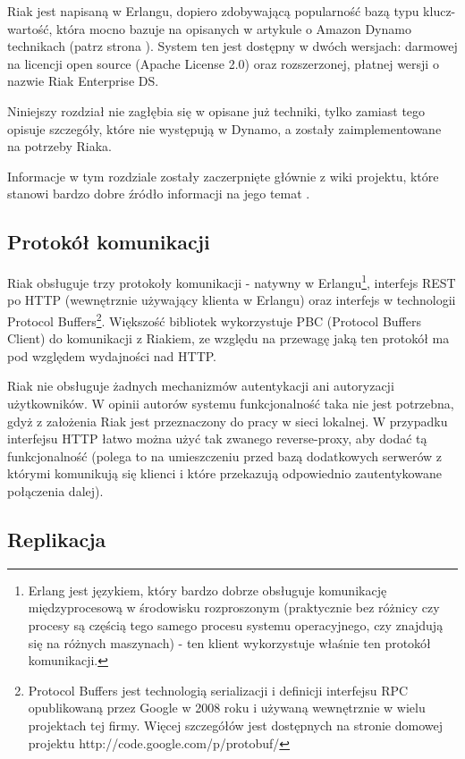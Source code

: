 Riak jest napisaną w Erlangu, dopiero zdobywającą popularność bazą typu klucz-wartość, która mocno bazuje na opisanych w artykule o Amazon Dynamo technikach (patrz strona \pageref{sec:dynamo-techniki}).
System ten jest dostępny w dwóch wersjach: darmowej na licencji open source (Apache License 2.0) oraz rozszerzonej, płatnej wersji o nazwie Riak Enterprise DS.

Niniejszy rozdział nie zagłębia się w opisane już techniki, tylko zamiast tego opisuje szczegóły, które nie występują w Dynamo, a zostały zaimplementowane na potrzeby Riaka.

Informacje w tym rozdziale zostały zaczerpnięte głównie z wiki projektu, które stanowi bardzo dobre źródło informacji na jego temat \cite{riak-wiki}.

\subsection*{Protokół komunikacji}

Riak obsługuje trzy protokoły komunikacji - natywny w Erlangu\footnote{Erlang jest językiem, który bardzo dobrze obsługuje komunikację międzyprocesową w środowisku rozproszonym (praktycznie bez różnicy czy procesy są częścią tego samego procesu systemu operacyjnego, czy znajdują się na różnych maszynach) - ten klient wykorzystuje właśnie ten protokół komunikacji.}, interfejs REST po HTTP (wewnętrznie używający klienta w Erlangu) oraz interfejs w technologii Protocol Buffers\footnote{Protocol Buffers jest technologią serializacji i definicji interfejsu RPC opublikowaną przez Google w 2008 roku i używaną wewnętrznie w wielu projektach tej firmy. Więcej szczegółów jest dostępnych na stronie domowej projektu http://code.google.com/p/protobuf/}.
Większość bibliotek wykorzystuje PBC (Protocol Buffers Client) do komunikacji z Riakiem, ze względu na przewagę jaką ten protokół ma pod względem wydajności nad HTTP.

Riak nie obsługuje żadnych mechanizmów autentykacji ani autoryzacji użytkowników.
W opinii autorów systemu funkcjonalność taka nie jest potrzebna, gdyż z założenia Riak jest przeznaczony do pracy w sieci lokalnej.
W przypadku interfejsu HTTP łatwo można użyć tak zwanego reverse-proxy, aby dodać tą funkcjonalność (polega to na umieszczeniu przed bazą dodatkowych serwerów z którymi komunikują się klienci i które przekazują odpowiednio zautentykowane połączenia dalej).

\subsection*{Replikacja}

